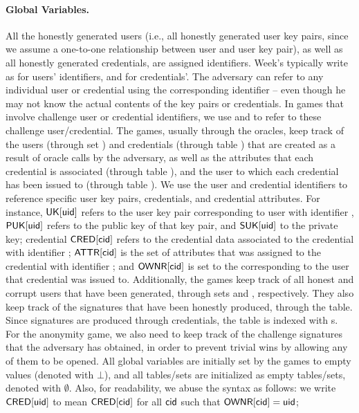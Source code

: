 \paragraph{Global Variables.} %
All the honestly generated users (i.e., all honestly generated user key pairs,
since we assume a one-to-one relationship between user and user key pair), as
well as all honestly generated credentials, are assigned identifiers. Week's
typically write as \uid for users' identifiers, and \cid for credentials'. The
adversary can
refer to any individual user or credential using the corresponding identifier --
even though he may not know the actual contents of the key pairs or credentials.
In games that involve challenge user or credential identifiers, we use \cuid and
\ccid to refer to these challenge user/credential.
%
The games, usually through the oracles, keep track of the users (through
set \UK) and credentials (through table \CRED) that are created as a result of
oracle calls by the adversary, as well as the attributes that each credential
is associated (through table \ATTR), and the user to which each credential has
been issued to (through table \OWNR). We use the user and credential identifiers
to reference specific user key pairs, credentials, and credential attributes.
For instance, $\mathsf{UK}[\mathsf{uid}]$ refers to the user key pair corresponding to user
with identifier \uid, $\mathsf{P}\mathsf{UK}[\mathsf{uid}]$ refers to the public key of that key pair,
and $\mathsf{S}\mathsf{UK}[\mathsf{uid}]$ to the private key; credential $\mathsf{CRED}[\mathsf{cid}]$ refers to the
credential data associated to the credential with identifier \cid; $\mathsf{ATTR}[\mathsf{cid}]$
is the set of attributes that was assigned to the credential with identifier
\cid; and $\mathsf{OWNR}[\mathsf{cid}]$ is set to the \uid corresponding to the user that
credential \cid was issued to.
%
Additionally, the games keep track of all honest and corrupt users that have
been generated, through sets \HU and \CU, respectively. They also keep track of
the signatures that have been honestly produced, through the \SIG table. Since
signatures are produced through credentials, the \SIG table is indexed with
{\cid}s. For the anonymity game, we also need to keep track of the challenge
signatures that the adversary has obtained, in order to prevent trivial wins
by allowing any of them to be opened. 
%
All global variables are initially set by the games to empty values (denoted
with $\bot$), and all tables/sets are initialized as empty tables/sets, denoted
with $\emptyset$. Also, for readability, we abuse the syntax as follows: we
write $\mathsf{CRED}[\mathsf{uid}]$ to mean $\mathsf{CRED}[\mathsf{cid}]$ for all $\mathsf{cid}$ such that
$\mathsf{OWNR}[\mathsf{cid}] = \mathsf{uid}$; 

